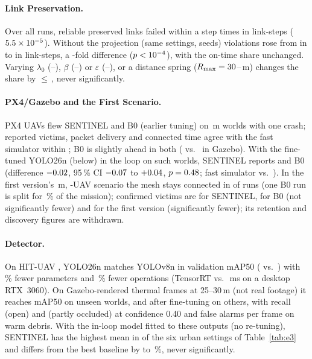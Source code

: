 \documentclass{IOS-Book-Article}
\newif\ifhighlight
\newenvironment{revised}{\ifhighlight\color{blue}\fi}{}
\begin{document}
\begin{revised}
\paragraph{Link Preservation.} Over all runs, reliable preserved links failed within a step \nViolAll{} times in \nStepsAll{} link-steps ($5.5\times10^{-5}$). Without the projection
(same \nSafetySettings{} settings, seeds) violations rose from \nViolOn{} in \nStepsOn{} to
\nViolOff{} in \nStepsOff{} link-steps, a \nViolFold-fold difference ($p<10^{-4}$), with the on-time
share unchanged. Varying $\lambda_0$ (\nSensLamLo--\nSensLamHi), $\beta$ (\nSensBetaLo--\nSensBetaHi)
or $\varepsilon$ (\nSensEpsLo--\nSensEpsHi), or a distance spring ($R_{\max}=30$--\nSensRmaxHi\,m)
changes the share by $\le$\,\nSensMaxDelta, never significantly.

\paragraph{PX4/Gazebo and the First Scenario.} \nEightN{} PX4 UAVs flew SENTINEL and B0 (earlier tuning) on
\nEightWorlds{} \nEightArea\,m worlds with one crash; reported victims, packet delivery and connected
time agree with the fast simulator within \nEightMaxDiff; B0 is slightly ahead in both
(\nEightSitlB{} vs.\ \nEightSitlS{} in Gazebo). With the fine-tuned YOLO26n (below) in the loop on \nSixN{} such worlds,
SENTINEL reports \nSixS{} and B0 \nSixB{} (difference $-0.02$, 95\,\% CI $-0.07$ to
$+0.04$, $p=0.48$; fast simulator \nSixFastS{} vs.\ \nSixFastB).
In the first version's \nNineArea\,m, \nNineN-UAV scenario the mesh stays connected in \nNineConnRuns{} of
\nNineRuns{} runs (one B0 run is split for \nNineDisPct\,\% of the mission); confirmed
victims are \nNineS{} for SENTINEL, \nNineBzero{} for B0 (not significantly fewer) and \nNineBone{} for
the first version (significantly fewer); its retention and discovery figures are withdrawn.

\paragraph{Detector.} On HIT-UAV \cite{hituav}, YOLO26n \cite{yolo26} matches YOLOv8n in validation
mAP50 (\nYnMap{} vs.\ \nVeMap) with \nYnParamRed\,\% fewer parameters and \nYnFlopRed\,\% fewer
operations (TensorRT \nYnTrt{} vs.\ \nVeTrt\,ms on a desktop RTX~3060).
On Gazebo-rendered thermal frames at 25--30\,m (not real footage) it reaches \nRdHMap{} mAP50 on
\nRdTestWorlds{} unseen worlds, and \nRdFMap{} after fine-tuning on \nRdTrainWorlds{} others, with recall
\nRdFRecLoOpen{} (open) and \nRdFRecLoOcc{} (partly occluded) at confidence 0.40 and \nRdFFaLo{} false
alarms per frame on warm debris. With the in-loop model fitted to these outputs (no re-tuning),
SENTINEL has the highest mean in \nRobNtop{} of the six urban settings of Table~\ref{tab:e3} and
differs from the best baseline by \nRobDiffLo{} to \nRobDiffHi\,\%, never significantly.
\end{revised}
\end{document}
